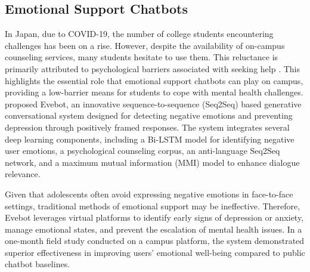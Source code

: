 \documentclass{xum_review}
\begin{document}
\subsection{Emotional Support Chatbots}

In Japan, due to COVID-19, the number of college students encountering
challenges has been on a rise. However, despite the availability of on-campus
counseling services, many students hesitate to use them. This reluctance is
primarily attributed to psychological barriers associated with seeking help
\citep{yasuda2021designing}. This highlights the essential role that emotional support
chatbots can play on campus, providing a low-barrier means for students to cope
with mental health challenges. \citet{yin2019deep} proposed Evebot,
an innovative sequence-to-sequence (Seq2Seq) based generative conversational
system designed for detecting negative emotions and preventing depression
through positively framed responses. The system integrates several deep learning
components, including a Bi-LSTM model for identifying negative user emotions, a
psychological counseling corpus, an anti-language Seq2Seq network, and a maximum
mutual information (MMI) model to enhance dialogue relevance.

Given that adolescents often avoid expressing negative emotions in face-to-face
settings, traditional methods of emotional support may be ineffective.
Therefore, Evebot leverages virtual platforms to identify early signs of
depression or anxiety, manage emotional states, and prevent the escalation of
mental health issues. In a one-month field study conducted on a campus platform,
the system demonstrated superior effectiveness in improving users' emotional
well-being compared to public chatbot baselines.
\end{document}
